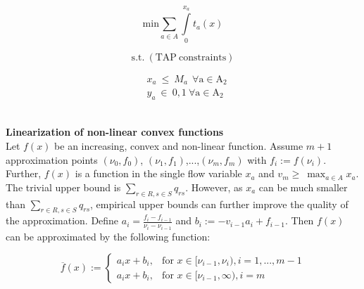 \documentclass[a4paper, 12pt]{article}
\begin{document}
\begin{large}
\boldmath\begin{equation*}
\mathrm{min}\sum_{a\in{A}} \int\limits_{0}^{x_a}t_{a}\left(x\right)
\end{equation*}
\end{large}
\indent\boldmath\begin{large}
\begin{equation*}
\mathrm{s.t.}\ \mathrm{\left(TAP\ constraints\right)}
\end{equation*}
\end{large}
\begin{large}
\begin{align*}
& x_{a}\ \leq\ M_{a}\ \ \mathrm{\forall{a}\in{A_{2}}} \\
& y_{a}\ \in\ {0,1}\ \mathrm{\forall{a}\in{A_{2}}}
\end{align*} %
\end{large} \\
\textbf{Linearization of non-linear convex functions}\\
Let $f\left(x\right)$ be an increasing, convex and non-linear function. Assume $m+1$ approximation points $\left(\nu_{0},f_{0}\right)$, $\left(\nu_{1},f_{1}\right)$,...,$\left(\nu_{m},f_{m}\right)$ with $f_{i}:=f\left(\nu_{i}\right)$. Further, $f\left(x\right)$ is a function in the single flow variable $x_{a}$ and $v_{m}\geq\ \max_{a\in{A}}{x_{a}}$. The trivial upper bound is $\sum_{r\in{R},s\in{S}} q_{rs}$. However, as $x_{a}$ can be much smaller than $\sum_{r\in{R},s\in{S}} q_{rs}$, empirical upper bounds can further improve the quality of the approximation. Define $a_{i}=\frac{f_{i}-f_{i-1}}{\nu_{i}-\nu_{i-1}}$ and $b_{i}:=-v_{i-1}a_{i}+f_{i-1}$. Then $f\left(x\right)$ can be approximated by the following function:
\begin{large}
\[
 \overline{f}(x) := 
  \begin{cases} 
   a_{i}x+b_{i}, & \text{for }  x \in{[\nu_{i-1},\nu_{i})},i=1,...,m-1  \\
   a_{i}x+b_{i}, & \text{for }  x \in{[\nu_{i-1},\infty)},i=m
  \end{cases}
\]
\end{large}
\end{document}
